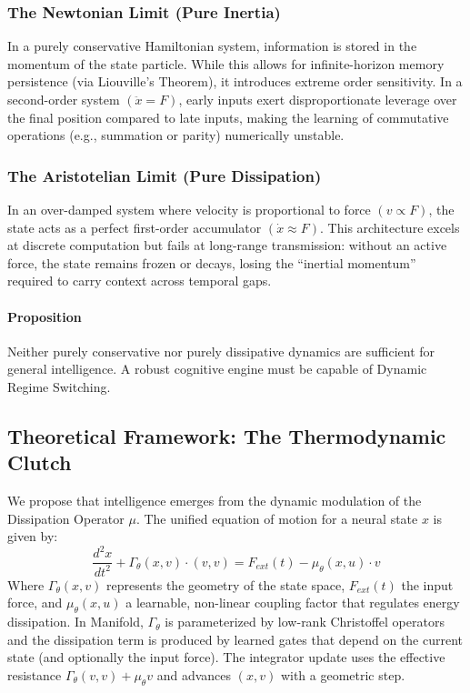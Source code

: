 \documentclass{article}
\numberwithin{equation}{section}
\begin{document}
\subsubsection{The Newtonian Limit (Pure Inertia)}
In a purely conservative Hamiltonian system, information is stored in the momentum of the state particle. While this allows for infinite-horizon memory persistence (via Liouville's Theorem), it introduces extreme order sensitivity. In a second-order system $(\ddot{x} = F)$, early inputs exert disproportionate leverage over the final position compared to late inputs, making the learning of commutative operations (e.g., summation or parity) numerically unstable.

\subsubsection{The Aristotelian Limit (Pure Dissipation)}
In an over-damped system where velocity is proportional to force $(v \propto F)$, the state acts as a perfect first-order accumulator $(\dot{x} \approx F)$. This architecture excels at discrete computation but fails at long-range transmission: without an active force, the state remains frozen or decays, losing the ``inertial momentum'' required to carry context across temporal gaps.

\paragraph{Proposition}
Neither purely conservative nor purely dissipative dynamics are sufficient for general intelligence. A robust cognitive engine must be capable of Dynamic Regime Switching.

\subsection{Theoretical Framework: The Thermodynamic Clutch}
We propose that intelligence emerges from the dynamic modulation of the Dissipation Operator $\mu$. The unified equation of motion for a neural state $x$ is given by:
\[
\frac{d^2 x}{dt^2} + \Gamma_\theta(x, v)\cdot (v, v) = F_{ext}(t) - \mu_\theta(x, u)\cdot v
\]
Where $\Gamma_\theta(x, v)$ represents the geometry of the state space, $F_{ext}(t)$ the input force, and $\mu_\theta(x, u)$ a learnable, non-linear coupling factor that regulates energy dissipation. In Manifold, $\Gamma_\theta$ is parameterized by low-rank Christoffel operators and the dissipation term is produced by learned gates that depend on the current state (and optionally the input force). The integrator update uses the effective resistance $\Gamma_\theta(v,v) + \mu_\theta v$ and advances $(x, v)$ with a geometric step.
\end{document}

